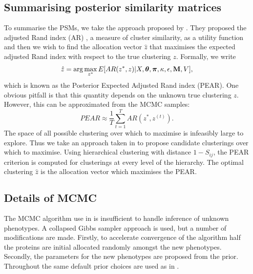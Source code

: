 \documentclass[12pt,english]{article}
\begin{document}
\subsection{Summarising posterior similarity matrices}
To summarise the PSMs, we take the approach proposed by \cite{fritsch::2009}. They proposed the adjusted Rand index (AR) \citep{rand::1971, Hubert::1985}, a measure of cluster similarity, as a utility function and then we wish to find the allocation vector $\hat{z}$ that maximises the expected adjusted Rand index with respect to the true clustering $z$. Formally, we write
\begin{equation}
\hat{z} = \arg \max_{z^*} E[AR(z^*, z)|X, \boldsymbol{\theta}, \boldsymbol{\pi} , \kappa, \epsilon, {\bf M}, V],
\end{equation}
which is known as the Posterior Expected Adjusted Rand index (PEAR). One obvious pitfall is that this quantity depends on the unknown true clustering $z$. However, this can be approximated from the MCMC samples:
\begin{equation}
PEAR \approx \frac{1}{T} \sum_{t = 1}^{T}AR(z^*, z^{(t)}).
\end{equation}
The space of all possible clustering over which to maximise is infeasibly large to explore. Thus we take an approach taken in \cite{fritsch::2009} to propose candidate clusterings over which to maximise. Using hierarchical clustering with distance $1 - S_{ij}$, the PEAR criterion is computed for clusterings at every level of the hierarchy. The optimal clustering $\hat{z}$ is the allocation vector which maximises the PEAR.
\subsection{Details of MCMC}
The MCMC algorithm use in \cite{Crook:2018} is insufficient to handle inference of unknown phenotypes. A collapsed Gibbs sampler approach is used, but a number of modifications are made. Firstly, to accelerate convergence of the algorithm half the proteins are initial allocated randomly amongst the new phenotypes. Secondly, the parameters for the new phenotypes are proposed from the prior. Throughout the same default prior choices are used as in \cite{Crook:2018}.

\clearpage


\end{document}
